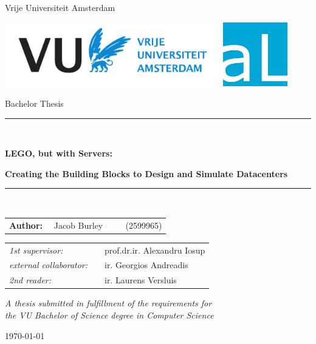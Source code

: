 \documentclass[11pt]{article}
\begin{document}
\thispagestyle{empty}
\newcommand{\opendc}{OpenDC}

\begin{center}

Vrije Universiteit Amsterdam

\vspace{1mm}

\includegraphics[height=28mm]{vu-griffioen-white.pdf}
\includegraphics[height=28mm]{atLarge.jpg}

\vspace{1.5cm}

{\Large Bachelor Thesis}

\vspace*{1.5cm}

\rule{.9\linewidth}{.6pt}\\[0.4cm]
{\huge \bfseries LEGO, but with Servers:\par}
{\Large \bfseries Creating the Building Blocks to Design and Simulate Datacenters\par}\vspace{0.4cm}
\rule{.9\linewidth}{.6pt}\\[1.5cm]

\vspace*{2mm}

{\Large
\begin{tabular}{l}
{\bf Author:} ~~Jacob Burley ~~~~ (2599965)
\end{tabular}
}

\vspace*{1.5cm}

\begin{tabular}{ll}
{\it 1st supervisor:}   & ~~prof.dr.ir. Alexandru Iosup \\
{\it external collaborator:}   & ~~ir. Georgios Andreadis \\
{\it 2nd reader:}       & ~~ir. Laurens Versluis

\end{tabular}

\vspace*{2cm}

\textit{A thesis submitted in fulfillment of the requirements for\\ the VU Bachelor of Science degree in Computer Science}

\vspace*{1cm}

\today\\[4cm] %

\end{center}
\end{document}
